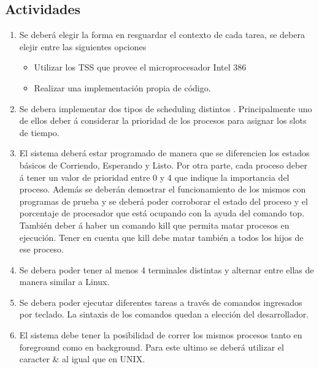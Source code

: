 \documentclass[10pt,a4paper]{article}
\begin{document}
	\subsection{Actividades}
		\begin{enumerate}	
			\item Se deber\'a elegir la forma en resguardar el contexto de cada tarea, se debera elejir entre las siguientes opciones
			\begin{itemize}
				\item Utilizar los TSS que provee el microprocesador Intel 386 
				\item Realizar una implementaci\'on propia de c\'odigo.
			\end{itemize}

			\item Se debera implementar dos tipos de scheduling distintos . Principalmente uno de ellos deber \'a considerar la prioridad de los procesos para asignar los slots de tiempo.

			\item El sistema deber\'a estar programado de manera que se diferencien los estados b\'asicos de Corriendo, Esperando y Listo. Por otra parte, cada proceso deber \'a tener un valor de prioridad entre 0 y 4 que indique la importancia del proceso.  Adem\'as se deber\'an demostrar el funcionamiento de los mismos con programas de prueba y se deber\'a poder corroborar el estado del proceso y el porcentaje de procesador que est\'a ocupando con la ayuda del comando top. Tambi\'en deber \'a haber un comando kill que permita matar procesos en ejecuci\'on. Tener en cuenta que kill debe matar tambi\'en a todos los hijos de ese proceso.


			\item Se debera poder tener al menos 4 terminales distintas y alternar entre ellas de manera similar a Linux.

			\item Se debera poder ejecutar diferentes tareas a trav\'es de comandos ingresados por teclado. La sintaxis de los comandos quedan a elecci\'on del desarrollador.

			\item El sistema debe tener la posibilidad de correr los mismos procesos tanto en foreground como en background. Para este ultimo se deber\'a utilizar el caracter \& al igual que en UNIX.


\end{enumerate}
\end{document}
